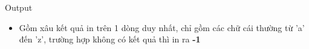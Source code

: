 Output  
\begin{itemize}
	\item     Gồm xâu kết quả in trên 1 dòng duy nhất, chỉ gồm các chữ cái thường từ 'a' đến 'z', trường hợp không có kết quả thì in ra    \textbf{     -1    }
\end{itemize}